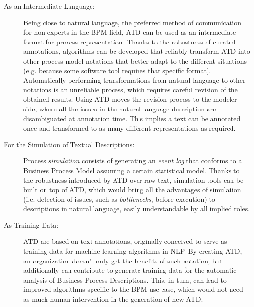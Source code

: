 \begin{description}
  \item[As an Intermediate Language:]{Being close to natural language, the
      preferred method of communication for non-experts in the BPM field, ATD
      can be used as an intermediate format for process representation. Thanks
      to the robustness of curated annotations, algorithms can be developed that
      reliably transform ATD into other process model notations that better
      adapt to the different situations (e.g. because some software tool
      requires that specific format). Automatically performing transformations
      from natural language to other notations is an unreliable process, which
      requires careful revision of the obtained results. Using ATD moves the
      revision process to the modeler side, where all the issues in the natural
      language description are disambiguated at annotation time. This implies a
      text can be annotated once and transformed to as many different
      representations as required.}
  \item[For the Simulation of Textual Descriptions:]{Process \emph{simulation}
      consists of generating an \emph{event log} that conforms to a Business
      Process Model\cite{burattin2015plg2} assuming a certain statistical
      model. Thanks to the robustness introduced by ATD over raw text,
      simulation tools can be built on top of ATD, which would bring all the
      advantages of simulation (i.e. detection of issues, such as
      \emph{bottlenecks}, before execution) to descriptions in natural language,
      easily understandable by all implied roles.}
  \item[As Training Data:]{ATD are based on text annotations, originally
      conceived to serve as training data for machine learning algorithms in
      NLP. By creating ATD, an organization doesn't only get the benefits of
      such notation, but additionally can contribute to generate training data
      for the automatic analysis of Business Process Descriptions. This, in
      turn, can lead to improved algorithms specific to the BPM use case, which
      would not need as much human intervention in the generation of new ATD.}
\end{description}



